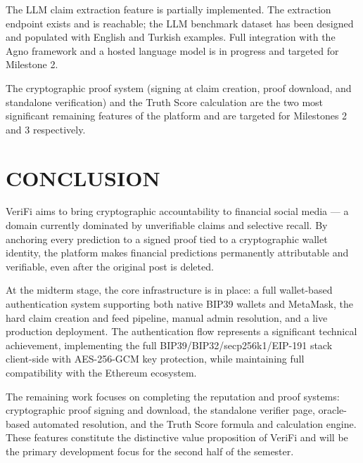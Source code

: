 \documentclass[a4paper,12pt]{report}
\begin{document}
The LLM claim extraction feature is partially implemented. The extraction endpoint exists and is reachable; the LLM benchmark dataset has been designed and populated with English and Turkish examples. Full integration with the Agno framework and a hosted language model is in progress and targeted for Milestone 2.

The cryptographic proof system (signing at claim creation, proof download, and standalone verification) and the Truth Score calculation are the two most significant remaining features of the platform and are targeted for Milestones 2 and 3 respectively.

\chapter{CONCLUSION}

VeriFi aims to bring cryptographic accountability to financial social media --- a domain currently dominated by unverifiable claims and selective recall. By anchoring every prediction to a signed proof tied to a cryptographic wallet identity, the platform makes financial predictions permanently attributable and verifiable, even after the original post is deleted.

\begin{sloppypar}
At the midterm stage, the core infrastructure is in place: a full wallet-based authentication system supporting both native BIP39 wallets and MetaMask, the hard claim creation and feed pipeline, manual admin resolution, and a live production deployment. The authentication flow represents a significant technical achievement, implementing the full BIP39/BIP32/secp256k1/EIP-191 stack client-side with AES-256-GCM key protection, while maintaining full compatibility with the Ethereum ecosystem.
\end{sloppypar}

The remaining work focuses on completing the reputation and proof systems: cryptographic proof signing and download, the standalone verifier page, oracle-based automated resolution, and the Truth Score formula and calculation engine. These features constitute the distinctive value proposition of VeriFi and will be the primary development focus for the second half of the semester.



\end{document}
